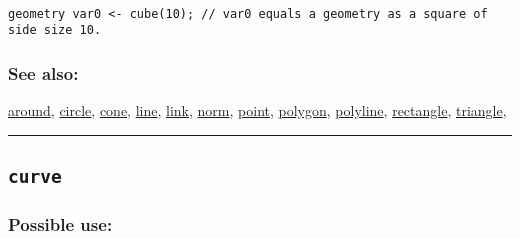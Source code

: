 \documentclass[]{book}
\theoremstyle{definition}
\theoremstyle{definition}
\theoremstyle{definition}
\theoremstyle{remark}
\begin{document}
\begin{verbatim}
 
geometry var0 <- cube(10); // var0 equals a geometry as a square of side size 10.
\end{verbatim}

\subsubsection{See also:}\label{see-also-73}

\href{OperatorsAA\#around}{around}, \href{OperatorsBC\#circle}{circle},
\href{OperatorsBC\#cone}{cone}, \href{OperatorsIM\#line}{line},
\href{OperatorsIM\#link}{link}, \href{OperatorsNR\#norm}{norm},
\href{OperatorsNR\#point}{point}, \href{OperatorsNR\#polygon}{polygon},
\href{OperatorsNR\#polyline}{polyline},
\href{OperatorsNR\#rectangle}{rectangle},
\href{OperatorsSZ\#triangle}{triangle},

\begin{center}\rule{0.5\linewidth}{\linethickness}\end{center}

\subsection{\texorpdfstring{\texttt{curve}}{curve}}\label{curve}

\subsubsection{Possible use:}\label{possible-use-122}
\end{document}
